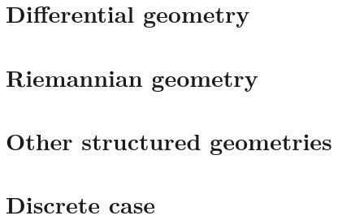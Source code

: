 
\section{Differential geometry}












\section{Riemannian geometry}










\section{Other structured geometries}





\section{Discrete case}

